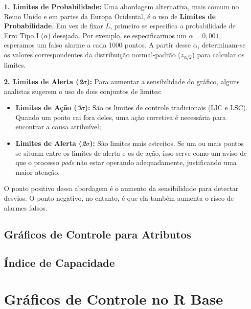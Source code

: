 \documentclass[
  portuguese,
  11pt,
  a4paper,
  DIV=11,
  numbers=noendperiod]{scrreprt}
\providecommand{\tightlist}{%
  \setlength{\itemsep}{0pt}\setlength{\parskip}{0pt}}
\begin{document}
\textbf{1. Limites de Probabilidade:} Uma abordagem alternativa, mais
comum no Reino Unido e em partes da Europa Ocidental, é o uso de
\textbf{Limites de Probabilidade}. Em vez de fixar \(L\), primeiro se
especifica a probabilidade de Erro Tipo I (\(\alpha\)) desejada. Por
exemplo, se especificarmos um \(\alpha = 0,001\), esperamos um falso
alarme a cada 1000 pontos. A partir desse \(\alpha\), determinam-se os
valores correspondentes da distribuição normal-padrão (\(z_{\alpha/2}\))
para calcular os limites.

\textbf{2. Limites de Alerta (\emph{2\(\sigma\)}):} Para aumentar a
sensibilidade do gráfico, alguns analistas sugerem o uso de dois
conjuntos de limites:

\begin{itemize}
\tightlist
\item
  \textbf{Limites de Ação (\emph{3\(\sigma\)}):} São os limites de
  controle tradicionais (LIC e LSC). Quando um ponto cai fora deles, uma
  ação corretiva é necessária para encontrar a causa atribuível;
\item
  \textbf{Limites de Alerta (\emph{2\(\sigma\)}):} São limites mais
  estreitos. Se um ou mais pontos se situam entre os limites de alerta e
  os de ação, isso serve como um aviso de que o processo \emph{pode} não
  estar operando adequadamente, justificando uma maior atenção.
\end{itemize}

O ponto positivo dessa abordagem é o aumento da sensibilidade para
detectar desvios. O ponto negativo, no entanto, é que ela também aumenta
o risco de alarmes falsos.


\chapter{Gráficos de Controle para
Atributos}\label{gruxe1ficos-de-controle-para-atributos}


\chapter{Índice de Capacidade}\label{uxedndice-de-capacidade}

\part{Gráficos de Controle no R Base}
\end{document}
